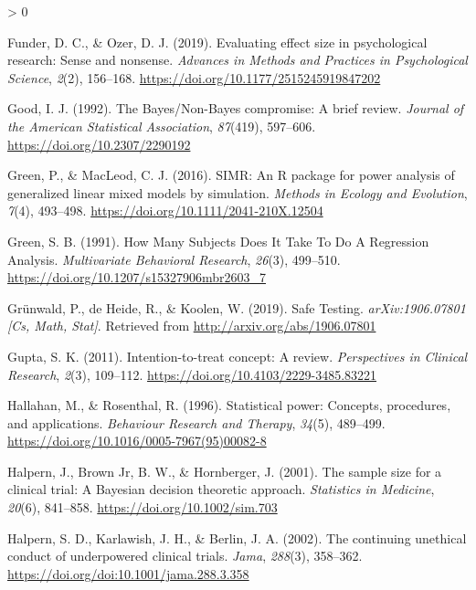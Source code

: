 \documentclass[
  english,
  ,jou,floatsintext]{apa6}
\newlength{\cslhangindent}
\newenvironment{CSLReferences}[2] %
 {%
  \setlength{\parindent}{0pt}
  \ifodd #1 \everypar{\setlength{\hangindent}{\cslhangindent}}\ignorespaces\fi
  \ifnum #2 > 0
  \setlength{\parskip}{#2\baselineskip}
  \fi
 }%
 {}
\begin{document}
\begin{CSLReferences}{1}{0}
\leavevmode\hypertarget{ref-funder_evaluating_2019}{}%
Funder, D. C., \& Ozer, D. J. (2019). Evaluating effect size in psychological research: {Sense} and nonsense. \emph{Advances in Methods and Practices in Psychological Science}, \emph{2}(2), 156--168. \url{https://doi.org/10.1177/2515245919847202}

\leavevmode\hypertarget{ref-good_bayesnon-bayes_1992}{}%
Good, I. J. (1992). The {Bayes}/{Non-Bayes} compromise: {A} brief review. \emph{Journal of the American Statistical Association}, \emph{87}(419), 597--606. \url{https://doi.org/10.2307/2290192}

\leavevmode\hypertarget{ref-green_simr_2016}{}%
Green, P., \& MacLeod, C. J. (2016). {SIMR}: An {R} package for power analysis of generalized linear mixed models by simulation. \emph{Methods in Ecology and Evolution}, \emph{7}(4), 493--498. \url{https://doi.org/10.1111/2041-210X.12504}

\leavevmode\hypertarget{ref-green_how_1991}{}%
Green, S. B. (1991). How {Many Subjects Does It Take To Do A Regression Analysis}. \emph{Multivariate Behavioral Research}, \emph{26}(3), 499--510. \url{https://doi.org/10.1207/s15327906mbr2603_7}

\leavevmode\hypertarget{ref-grunwald_safe_2019}{}%
Grünwald, P., de Heide, R., \& Koolen, W. (2019). Safe {Testing}. \emph{arXiv:1906.07801 {[}Cs, Math, Stat{]}}. Retrieved from \url{http://arxiv.org/abs/1906.07801}

\leavevmode\hypertarget{ref-gupta_intention_2011}{}%
Gupta, S. K. (2011). Intention-to-treat concept: {A} review. \emph{Perspectives in Clinical Research}, \emph{2}(3), 109--112. \url{https://doi.org/10.4103/2229-3485.83221}

\leavevmode\hypertarget{ref-hallahan_statistical_1996}{}%
Hallahan, M., \& Rosenthal, R. (1996). Statistical power: {Concepts}, procedures, and applications. \emph{Behaviour Research and Therapy}, \emph{34}(5), 489--499. \url{https://doi.org/10.1016/0005-7967(95)00082-8}

\leavevmode\hypertarget{ref-halpern_sample_2001}{}%
Halpern, J., Brown Jr, B. W., \& Hornberger, J. (2001). The sample size for a clinical trial: {A Bayesian} decision theoretic approach. \emph{Statistics in Medicine}, \emph{20}(6), 841--858. \url{https://doi.org/10.1002/sim.703}

\leavevmode\hypertarget{ref-halpern_continuing_2002}{}%
Halpern, S. D., Karlawish, J. H., \& Berlin, J. A. (2002). The continuing unethical conduct of underpowered clinical trials. \emph{Jama}, \emph{288}(3), 358--362. \url{https://doi.org/doi:10.1001/jama.288.3.358}


\end{CSLReferences}
\end{document}

